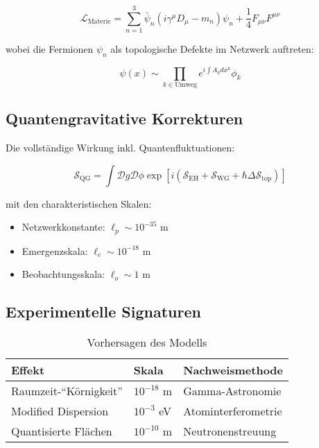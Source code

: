 \begin{equation}
    \mathcal{L}_{\text{Materie}} = \sum_{n=1}^{3} \bar{\psi}_n (i\gamma^\mu D_\mu - m_n)\psi_n + \frac{1}{4} F_{\mu\nu}F^{\mu\nu}
\end{equation}

wobei die Fermionen $\psi_n$ als topologische Defekte im Netzwerk auftreten:

\begin{equation}
    \psi(x) \sim \prod_{k \in \text{Umweg}} e^{i\int A_k dx^k} \phi_k
\end{equation}

\subsection{Quantengravitative Korrekturen}
Die vollständige Wirkung inkl. Quantenfluktuationen:

\begin{equation}
    \mathcal{S}_{\text{QG}} = \int \mathcal{D}g\mathcal{D}\phi \exp\left[ i\left( \mathcal{S}_{\text{EH}} + \mathcal{S}_{\text{WG}} + \hbar \Delta \mathcal{S}_{\text{top}} \right) \right]
\end{equation}

mit den charakteristischen Skalen:
\begin{itemize}
    \item Netzwerkkonstante: $\ell_p \sim 10^{-35}$ m
    \item Emergenzskala: $\ell_e \sim 10^{-18}$ m
    \item Beobachtungsskala: $\ell_o \sim 1$ m
\end{itemize}

\subsection{Experimentelle Signaturen}
\begin{table}[h]
    \centering
    \begin{tabular}{lll}
        \toprule
        Effekt & Skala & Nachweismethode \\
        \midrule
        Raumzeit-\enquote{Körnigkeit} & $10^{-18}$ m & Gamma-Astronomie \\
        Modified Dispersion & $10^{-3}$ eV & Atominterferometrie \\
        Quantisierte Flächen & $10^{-10}$ m & Neutronenstreuung \\
        \bottomrule
    \end{tabular}
    \caption{Vorhersagen des Modells}
\end{table}

